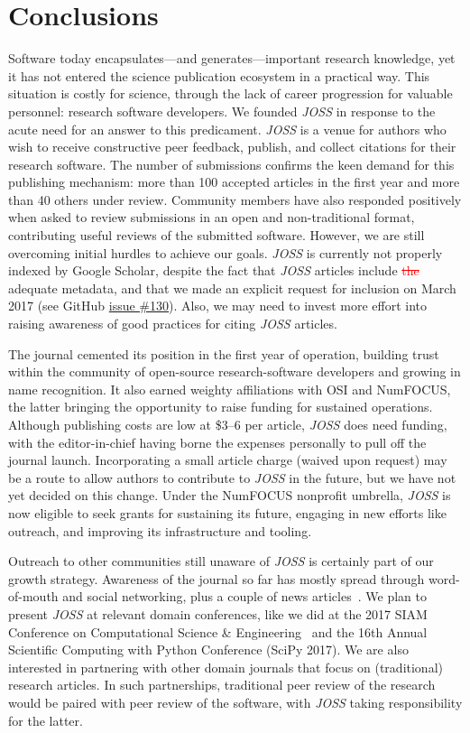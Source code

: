 \documentclass{article}
\newcommand{\delete}[1]{\sloppy\cbcolor{red}\textcolor{red}{\cbdelete \sout{#1}}}
\newcommand\joss{\textit{JOSS}}
\begin{document}
\section{Conclusions}
\label{conclusions}

Software today encapsulates---and generates---important research knowledge, yet
it has not entered the science publication ecosystem in a practical way.
This situation is costly for science, through the lack of career progression for
valuable personnel: research software developers.
We founded \joss{} in response to the acute need for an answer to this predicament.
\joss{} is a venue for authors who wish to receive constructive peer feedback,
publish, and collect citations for their research software.
The number of submissions confirms the keen demand for this publishing mechanism:
more than 100 accepted articles in the first year and more than 40 others under review.
Community members have also responded positively when asked to review submissions
in an open and non-traditional format, contributing useful reviews of the submitted software.
However, we are still overcoming initial hurdles to achieve our goals. \joss{} is
currently not properly indexed by Google Scholar, despite the fact that \joss{}
articles include \delete{the} adequate metadata, and that we made an explicit request for
inclusion on March 2017 (see GitHub \href{https://github.com/openjournals/joss/issues/130}{issue \#130}).
Also, we may need to invest more effort into raising awareness of good practices
for citing \joss{} articles.

The journal cemented its position in the first year of operation, building trust within the community of open-source research-software developers and growing in name recognition.
It also earned weighty affiliations with OSI and NumFOCUS, the latter bringing the opportunity to raise funding for sustained operations.
Although publishing costs are low at \$3--6 per article, \joss{} does need funding, with the editor-in-chief having borne the expenses personally to pull off the journal launch.
Incorporating a small article charge (waived upon request) may be a route to allow authors to contribute to \joss{} in the future, but we have not yet decided on this change.
Under the NumFOCUS nonprofit umbrella, \joss{} is now eligible to seek grants for sustaining its future, engaging in new efforts like outreach, and improving its infrastructure and tooling.

Outreach to other communities still unaware of \joss{} is certainly part of our growth strategy.
Awareness of the journal so far has mostly spread through word-of-mouth and social networking, plus a couple of news articles~\cite{Nature:joss,SDtimes:joss}.
We plan to present \joss{} at relevant domain conferences,
like we did at the 2017 SIAM Conference
on Computational Science \& Engineering~\cite{JOSS-CSE-poster} and the 16th Annual Scientific Computing with Python Conference (SciPy 2017).
We are also interested in partnering
with other domain journals that focus on (traditional) research articles.
In such partnerships,
traditional peer review of the research would be paired with peer review of the software, with \joss{} taking responsibility for the latter.
\end{document}
